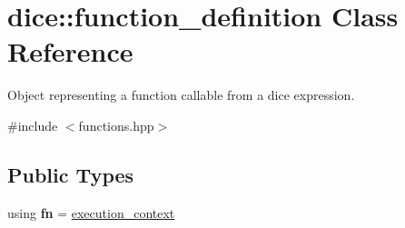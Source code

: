 \hypertarget{classdice_1_1function__definition}{}\section{dice\+:\+:function\+\_\+definition Class Reference}
\label{classdice_1_1function__definition}


Object representing a function callable from a dice expression.  




{\ttfamily \#include $<$functions.\+hpp$>$}

\subsection*{Public Types}
\begin{DoxyCompactItemize}
\item 
\mbox{\label{classdice_1_1function__definition_aa70e7d16099e2eaf30cf4c6ffb58f7e3}} 
using {\bfseries fn} = \mbox{\hyperlink{classdice_1_1execution__context}{execution\+\_\+context}}
\end{DoxyCompactItemize}
